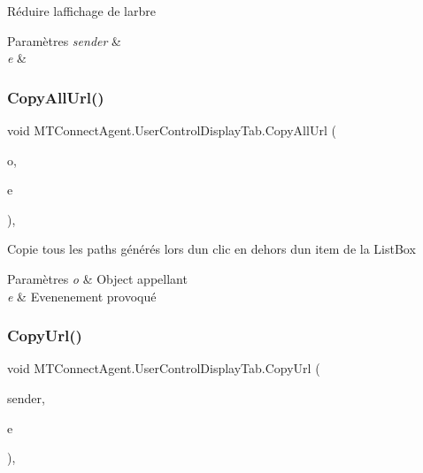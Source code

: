 Réduire l\textquotesingle{}affichage de l\textquotesingle{}arbre 


\begin{DoxyParams}{Paramètres}
{\em sender} & \\
\hline
{\em e} & \\
\hline
\end{DoxyParams}
\mbox{\label{class_m_t_connect_agent_1_1_user_control_display_tab_ac473c5026d9d7af94210c53170be841b}} 
\subsubsection{\texorpdfstring{Copy\+All\+Url()}{CopyAllUrl()}}
{\footnotesize\ttfamily void M\+T\+Connect\+Agent.\+User\+Control\+Display\+Tab.\+Copy\+All\+Url (\begin{DoxyParamCaption}\item[{object}]{o,  }\item[{Mouse\+Event\+Args}]{e }\end{DoxyParamCaption})\hspace{0.3cm}{\ttfamily [inline]}, {\ttfamily [private]}}



Copie tous les paths générés lors d\textquotesingle{}un clic en dehors d\textquotesingle{}un item de la List\+Box 


\begin{DoxyParams}{Paramètres}
{\em o} & Object appellant\\
\hline
{\em e} & Evenenement provoqué\\
\hline
\end{DoxyParams}
\mbox{\label{class_m_t_connect_agent_1_1_user_control_display_tab_ac246a46fbe6cab71326ea2a6e6ade5cd}} 
\subsubsection{\texorpdfstring{Copy\+Url()}{CopyUrl()}}
{\footnotesize\ttfamily void M\+T\+Connect\+Agent.\+User\+Control\+Display\+Tab.\+Copy\+Url (\begin{DoxyParamCaption}\item[{object}]{sender,  }\item[{Mouse\+Event\+Args}]{e }\end{DoxyParamCaption})\hspace{0.3cm}{\ttfamily [inline]}, {\ttfamily [private]}}



